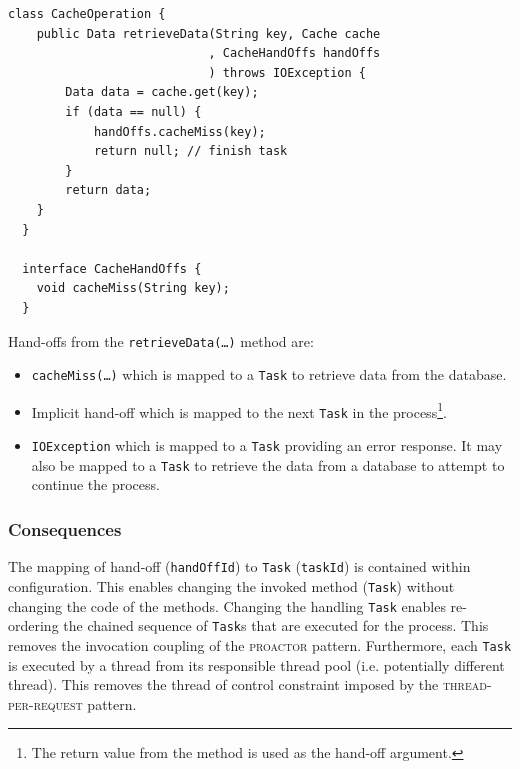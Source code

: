 \documentclass[prodmode]{style/acmlarge}
\begin{document}
\lstset{caption=Example developer code of a task for retrieving data from a cache\protect\footnotemark}
\begin{lstlisting}[float,label=lst:Example_Method_Task]
  class CacheOperation {
    public Data retrieveData(String key, Cache cache
                            , CacheHandOffs handOffs
                            ) throws IOException {
        Data data = cache.get(key);
        if (data == null) {
            handOffs.cacheMiss(key);
            return null; // finish task
        }
        return data;
    }
  }

  interface CacheHandOffs {
    void cacheMiss(String key);
  }
\end{lstlisting}

Hand-offs from the \texttt{retrieveData(\ldots)} method are:
\begin{itemize}
  \item \texttt{cacheMiss(\ldots)} which is mapped to a \texttt{Task} to retrieve data from the database.
  \item Implicit hand-off which is mapped to the next \texttt{Task} in the process\footnote{The return value from the method is used as the hand-off argument.}.
  \item \texttt{IOException} which is mapped to a \texttt{Task} providing an error response.  It may also be mapped to a \texttt{Task} to retrieve the data from a database to attempt to continue the process.
\end{itemize}


\subsubsection*{Consequences}

The mapping of hand-off (\texttt{handOffId}) to \texttt{Task} (\texttt{taskId})
is contained within configuration.  This enables changing the invoked method
(\texttt{Task}) without changing the code of the methods.  Changing the handling
\texttt{Task} enables re-ordering the chained sequence of \texttt{Task}s that
are executed for the process.  This removes the invocation coupling of the
\textsc{proactor} pattern.  Furthermore, each \texttt{Task} is executed by a
thread from its responsible thread pool (i.e. potentially different thread). 
This removes the thread of control constraint imposed by the
\textsc{thread-per-request} pattern.
\end{document}

